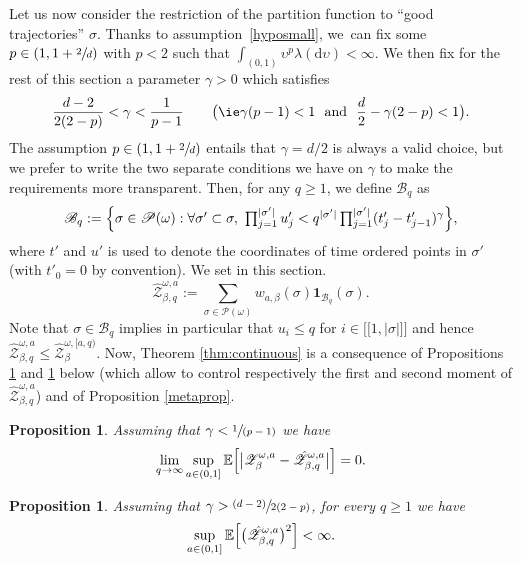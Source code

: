 \documentclass[10pt]{amsart}
\let\mathcal\mathscr
\let\sep:
\newcommand{\psfrac}[2]{\sfrac{(#1)}{#2}}
\newcommand{\spfrac}[2]{\sfrac{#1}{(#2)}}
\newcommand{\lint}{\mathopen{[\![}}
\newcommand{\rint}{\mathclose{]\!]}}
\newtheorem{proposition}[theorem]{Proposition}
\theoremstyle{definition}
\newcommand{\dd}{\mathrm{d}}
\newcommand{\ind}{\mathbf{1}}
\newcommand{\cB}{{\ensuremath{\mathcal B}} }
\newcommand{\cP}{{\ensuremath{\mathcal P}} }
\newcommand{\cZ}{{\ensuremath{\mathcal Z}} }
\newcommand{\bbE}{{\ensuremath{\mathbb E}} }
\let\ups\upsilon
\let\go\omega
\begin{document}
Let us now consider the restriction of the partition function to ``good trajectories'' $\sigma$.
Thanks to assumption~\eqref{hyposmall}, we~can fix some $p\in (1,1+\sfrac 2d)$ with $p<2$ such that $\int_{(0,1)} \ups^{p} \lambda(\dd \ups)<\infty$.
We then fix for the rest of this section a parameter $\gamma>0$ which satisfies
\begin{equation}
\label{lesdeuxconds}
\frac{d-2}{2(2-p)} < \gamma < \frac{1}{p-1} \qquad \bigl(\text{\ie}\gamma(p-1)<1 \ \text{ and } \ \frac d2 -\gamma(2-p) <1 \bigr).
\end{equation}
The assumption $p \in (1, 1+\sfrac 2d)$ entails that $\gamma=d/2$ is always a valid choice, but
we prefer to write the two separate conditions we have on $\gamma$ to make the requirements more transparent.
Then, for any $q \geq 1$, we define $ \cB_q$ as
\begin{equation}
\label{def:BNcont}\textstyle
\cB_q :=\Bigl\{ \sigma \in \cP(\go) \sep \forall \sigma'\subset \sigma, \ \prod_{j=1}^{|\sigma'|} u'_j < q^{|\sigma'|} \prod_{j=1}^{|\sigma'|} (t_j'-t_{j-1}')^{\gamma} \Bigr\},
\end{equation}
where $t'$ and $u'$ is used to denote the coordinates of time ordered points in $\sigma'$ (with $t'_0=0$ by convention).
We set in this section.
\begin{equation}
\hat \cZ^{\go,a}_{\beta,q}:= \sum_{\sigma \in \cP(\go)} w_{a,\beta}(\sigma) \ind_{ \cB_q}(\sigma).
\end{equation}
Note that $\sigma\in \cB_q$ implies in particular that $u_i\le q$ for $i\in \lint 1, |\sigma| \rint$ and hence $\hat \cZ^{\go,a}_{\beta,q}\le \hat \cZ^{\go,[a,q)}_{\beta}$.
Now, Theorem \ref{thm:continuous} is a consequence of Propositions \ref{lesper} and \ref{llavar} below (which allow to control respectively the first and second moment of $\hat \cZ^{\go,a}_{\beta,q}$) and of Proposition \ref{metaprop}.

\begin{proposition}\label{lesper}
Assuming that $\gamma < \spfrac{1}{p-1}$ we have
\begin{equation}\label{unif1}
\lim_{q \to \infty} \sup_{a\in(0,1]} \bbE \Bigl[ \big| \cZ^{\go,a}_{\beta}- \hat \cZ^{\go,a}_{\beta,q} \big| \Bigr]=0.
\end{equation}
\end{proposition}

\begin{proposition}\label{llavar}
Assuming that $\gamma>\psfrac{d-2}{2(2-p)}$,
for every $q\ge 1$ we have
\begin{equation}\label{unif2}
\sup_{a\in(0,1]} \bbE \Bigl[ \bigl(\hat \cZ^{\go,a}_{\beta,q} \bigr)^2 \Bigr]<\infty.
\end{equation}
\end{proposition}
\end{document}

